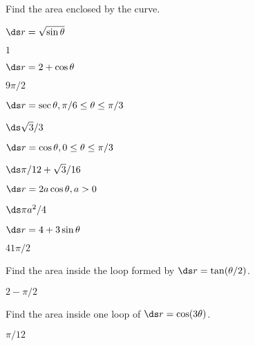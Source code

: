 \begin{exercises}

\noindent Find the area enclosed by the curve.

\twocol

\begin{exercise} $\ds r=\sqrt{\sin\theta}$
\begin{answer} $1$
\end{answer}\end{exercise}

\begin{exercise} $\ds r=2+\cos\theta$
\begin{answer} $9\pi/2$
\end{answer}\end{exercise}

\begin{exercise} $\ds r=\sec\theta, \pi/6\le\theta\le\pi/3$
\begin{answer} $\ds \sqrt3/3$
\end{answer}\end{exercise}

\begin{exercise} $\ds r=\cos\theta, 0\le\theta\le\pi/3$
\begin{answer} $\ds \pi/12+\sqrt3/16$
\end{answer}\end{exercise}

\begin{exercise} $\ds r=2a\cos\theta, a>0$
\begin{answer} $\ds \pi a^2/4$
\end{answer}\end{exercise}

\begin{exercise} $\ds r=4+3\sin\theta$
\begin{answer} $41\pi/2$
\end{answer}\end{exercise}

\endtwocol

\begin{exercise} Find the area inside the loop formed by
$\ds r=\tan(\theta/2)$.
\begin{answer} $2-\pi/2$
\end{answer}\end{exercise}

\begin{exercise} Find the area inside one loop of $\ds r=\cos(3\theta)$.
\begin{answer} $\pi/12$
\end{answer}\end{exercise}


\end{exercises}
